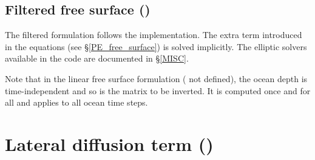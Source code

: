

\subsection{Filtered free surface ()}
\label{DYN_spg_fltp}

The filtered formulation follows the \citet{Roullet_Madec_JGR00} implementation. 
The extra term introduced in the equations (see \S\ref{PE_free_surface}) is solved implicitly. 
The elliptic solvers available in the code are documented in \S\ref{MISC}.


Note that in the linear free surface formulation ( not defined), the ocean depth 
is time-independent and so is the matrix to be inverted. It is computed once and for all and applies to all ocean time steps. 

\section  [Lateral diffusion term (\textit{dynldf})]
		{Lateral diffusion term ()}
\label{DYN_ldf}

